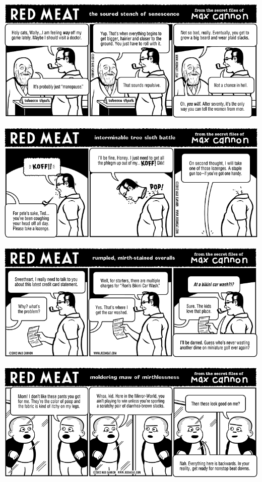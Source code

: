 \documentclass[a4paper,twoside,11pt]{article}
\begin{document}
\includegraphics[width=\textwidth]{redmeat_2012-06-26.png}



\includegraphics[width=\textwidth]{redmeat_2012-07-03.png}



\includegraphics[width=\textwidth]{redmeat_2012-07-10.png}



\includegraphics[width=\textwidth]{redmeat_2012-07-17.png}
\end{document}

